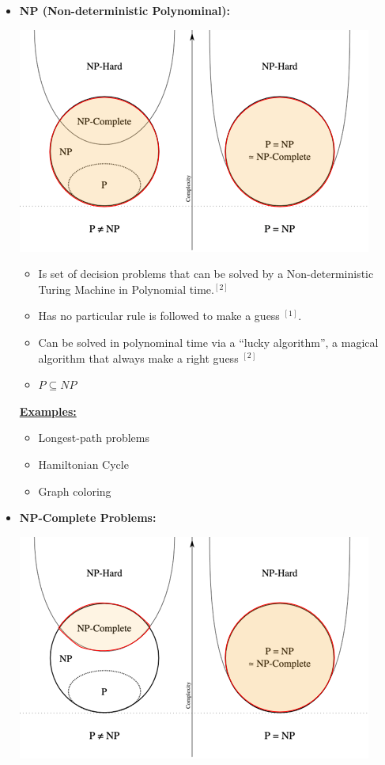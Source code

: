 \documentclass[12pt]{article}
\begin{document}
\begin{enumerate}[1.]
\begin{itemize}
        \bigskip

        \item \textbf{NP (Non-deterministic Polynominal):}

        \begin{center}
        \includegraphics[width=0.7\linewidth]{images/worksheet_7_solution_2.png}
        \end{center}

        \begin{itemize}
            \item Is set of decision problems that can be solved by a Non-deterministic Turing Machine in Polynomial time.$^{[2]}$
            \item Has no particular rule is followed to make a guess $^{[1]}$.
            \item Can be solved in polynominal time via a ``lucky algorithm'', a magical algorithm that always make a right guess $^{[2]}$
            \item $P \subseteq NP$
        \end{itemize}

        \bigskip

        \underline{\textbf{Examples:}}

        \begin{itemize}
            \item Longest-path problems
            \item Hamiltonian Cycle
            \item Graph coloring
        \end{itemize}

        \bigskip

        \item \textbf{NP-Complete Problems:}

        \begin{center}
        \includegraphics[width=0.7\linewidth]{images/worksheet_7_solution_3.png}
        \end{center}


\end{itemize}
\end{enumerate}
\end{document}
